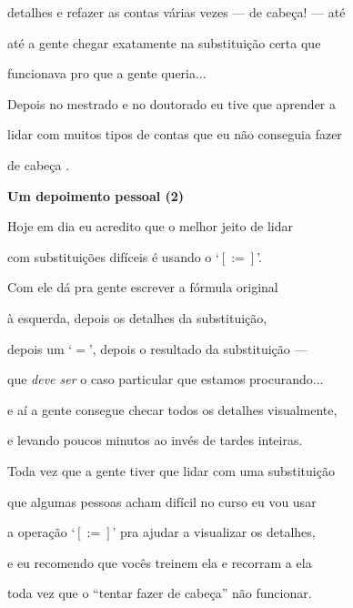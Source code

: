 \documentclass[oneside,12pt]{article}
\begin{document}
detalhes e refazer as contas várias vezes --- de cabeça! --- até

até a gente chegar exatamente na substituição certa que

funcionava pro que a gente queria...

\msk

Depois no mestrado e no doutorado eu tive que aprender a

lidar com muitos tipos de contas que eu não conseguia fazer

de cabeça .

\newpage


{\bf Um depoimento pessoal (2)}

Hoje em dia eu acredito que o melhor jeito de lidar

com substituições difíceis é usando o `$[:=]$'.

\msk

Com ele dá pra gente escrever a fórmula original

à esquerda, depois os detalhes da substituição,

depois um `$=$', depois o resultado da substituição ---

que {\it deve ser} o caso particular que estamos procurando...

e aí a gente consegue checar todos os detalhes visualmente,

e levando poucos minutos ao invés de tardes inteiras.

\msk

Toda vez que a gente tiver que lidar com uma substituição

que algumas pessoas acham difícil no curso eu vou usar

a operação `$[:=]$' pra ajudar a visualizar os detalhes,

e eu recomendo que vocês treinem ela e recorram a ela

toda vez que o ``tentar fazer de cabeça'' não funcionar.






\end{document}
